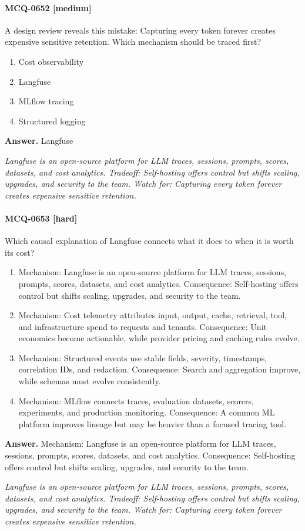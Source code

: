 \paragraph{MCQ-0652 [medium]} A design review reveals this mistake: Capturing every token forever creates expensive sensitive retention. Which mechanism should be traced first?
\begin{enumerate}[label=\Alph*.]
\item Cost observability
\item Langfuse
\item MLflow tracing
\item Structured logging
\end{enumerate}
\noindent\textbf{Answer.} Langfuse
\par\textit{Langfuse is an open-source platform for LLM traces, sessions, prompts, scores, datasets, and cost analytics. Tradeoff: Self-hosting offers control but shifts scaling, upgrades, and security to the team. Watch for: Capturing every token forever creates expensive sensitive retention.}
\paragraph{MCQ-0653 [hard]} Which causal explanation of Langfuse connects what it does to when it is worth its cost?
\begin{enumerate}[label=\Alph*.]
\item Mechanism: Langfuse is an open-source platform for LLM traces, sessions, prompts, scores, datasets, and cost analytics. Consequence: Self-hosting offers control but shifts scaling, upgrades, and security to the team.
\item Mechanism: Cost telemetry attributes input, output, cache, retrieval, tool, and infrastructure spend to requests and tenants. Consequence: Unit economics become actionable, while provider pricing and caching rules evolve.
\item Mechanism: Structured events use stable fields, severity, timestamps, correlation IDs, and redaction. Consequence: Search and aggregation improve, while schemas must evolve consistently.
\item Mechanism: MLflow connects traces, evaluation datasets, scorers, experiments, and production monitoring. Consequence: A common ML platform improves lineage but may be heavier than a focused tracing tool.
\end{enumerate}
\noindent\textbf{Answer.} Mechanism: Langfuse is an open-source platform for LLM traces, sessions, prompts, scores, datasets, and cost analytics. Consequence: Self-hosting offers control but shifts scaling, upgrades, and security to the team.
\par\textit{Langfuse is an open-source platform for LLM traces, sessions, prompts, scores, datasets, and cost analytics. Tradeoff: Self-hosting offers control but shifts scaling, upgrades, and security to the team. Watch for: Capturing every token forever creates expensive sensitive retention.}
